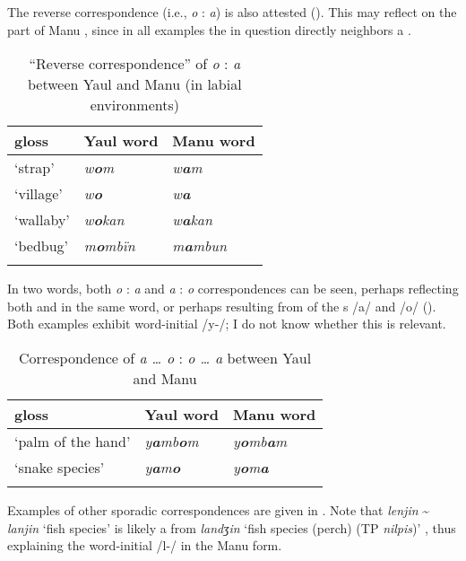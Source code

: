 The reverse correspondence (i.e., \textit{o} : \textit{a}) is also attested (). This may reflect  on the part of Manu , since in all examples the  in question directly neighbors a  .


\begin{table}
\caption{“Reverse correspondence” of \textit{o} : \textit{a} between Yaul and Manu (in labial environments)}
\label{tab:18.19}

\begin{tabular}{lll}

\lsptoprule

gloss & Yaul word & Manu word\\
\midrule
‘strap’ & {\itshape w\textbf{o}m} & {\itshape w\textbf{a}m}\\
‘village’ & {\itshape w\textbf{o}} & {\itshape w\textbf{a}}\\
‘wallaby’ & {\itshape w\textbf{o}kan} & {\itshape w\textbf{a}kan}\\
‘bedbug’ & {\itshape m\textbf{o}mbïn} & {\itshape m\textbf{a}mbun}\\
\lspbottomrule
\end{tabular}
\end{table}
In two words, both \textit{o} : \textit{a} and \textit{a} : \textit{o} correspondences can be seen, perhaps reflecting both  and  in the same word, or perhaps resulting from  of the s /a/ and /o/ (). Both examples exhibit word-initial /y-/; I do not know whether this is relevant.


\begin{table}
\caption{Correspondence of \textit{a … o} : \textit{o … a} between Yaul and Manu}
\label{tab:18.20}


\begin{tabular}{lll}

\lsptoprule

gloss & Yaul word & Manu word\\
\midrule
‘palm of the hand’ & {\itshape y\textbf{a}mb\textbf{o}m} & {\itshape y\textbf{o}mb\textbf{a}m}\\
‘snake species’ & {\itshape y\textbf{a}m\textbf{o}} & {\itshape y\textbf{o}m\textbf{a}}\\
\lspbottomrule
\end{tabular}
\end{table}
Examples of other sporadic  correspondences are given in . Note that \textit{lenjin} {\textasciitilde} \textit{lanjin} ‘fish species’ is likely a  from  \textit{landʒin} ‘fish species (perch) (TP \textit{nilpis})’ \citep[77]{Barlow2021}, thus explaining the word-initial /l-/ in the Manu form.


